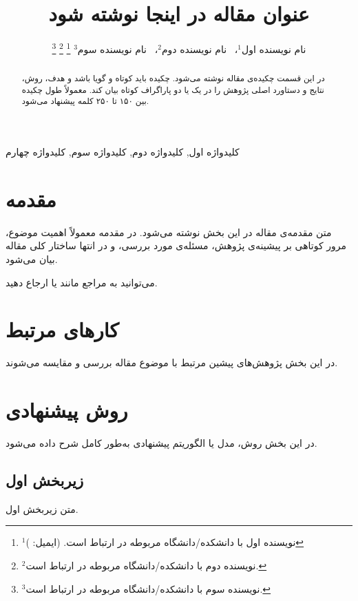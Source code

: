 \documentclass[journal]{IEEEtran}
\title{عنوان مقاله در اینجا نوشته شود}
\author{
	نام نویسنده اول$^{1}$،~
	نام نویسنده دوم$^{2}$،~
	نام نویسنده سوم$^{3}$
	\thanks{$^{1}$نویسنده اول با دانشکده/دانشگاه مربوطه در ارتباط است. (ایمیل: \lr{author1@example.com})}
	\thanks{$^{2}$نویسنده دوم با دانشکده/دانشگاه مربوطه در ارتباط است.}
	\thanks{$^{3}$نویسنده سوم با دانشکده/دانشگاه مربوطه در ارتباط است.}
}
\makeatletter
\newif\if@infw
\newenvironment{fullwidth}
{\if@twocolumn\@infwtrue\strip\else\@infwfalse\fi}
{\if@infw\endstrip\fi}
\let\keptmaketitle\maketitle
\let\maketitle\keptmaketitle
\makeatother
\begin{document}
	
	\maketitle
	
	\begin{fullwidth}
		\begin{abstract}
			در این قسمت چکیده‌ی مقاله نوشته می‌شود. چکیده باید کوتاه و گویا باشد و
			هدف، روش، نتایج و دستاورد اصلی پژوهش را در یک یا دو پاراگراف کوتاه بیان کند.
			معمولاً طول چکیده بین ۱۵۰ تا ۲۵۰ کلمه پیشنهاد می‌شود.
		\end{abstract}
		
		\begin{IEEEkeywords}
			کلیدواژه اول, کلیدواژه دوم, کلیدواژه سوم, کلیدواژه چهارم
		\end{IEEEkeywords}
	\end{fullwidth}
	\FloatBarrier
	\section{مقدمه}
	متن مقدمه‌ی مقاله در این بخش نوشته می‌شود. در مقدمه معمولاً
	اهمیت موضوع، مرور کوتاهی بر پیشینه‌ی پژوهش، مسئله‌ی مورد بررسی، و در انتها
	ساختار کلی مقاله بیان می‌شود.
	
	می‌توانید به مراجع مانند \cite{ref1} یا \cite{ref2} ارجاع دهید.
	
	\section{کارهای مرتبط}
	در این بخش پژوهش‌های پیشین مرتبط با موضوع مقاله بررسی و مقایسه می‌شوند.
	
	\section{روش پیشنهادی}
	در این بخش روش، مدل یا الگوریتم پیشنهادی به‌طور کامل شرح داده می‌شود.
	
	\subsection{زیربخش اول}
	متن زیربخش اول.
	
\end{document}
